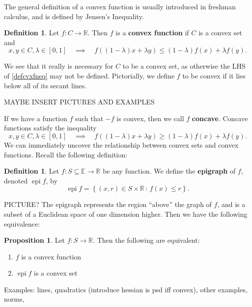\documentclass[11pt]{article}
\numberwithin{equation}{section}
\theoremstyle{definition}
\newtheorem{proposition}[theorem]{Proposition}
\newtheorem{definition}[theorem]{Definition}%
\newcommand{\bE}{\mathbb{E}}
\newcommand{\bR}{\mathbb{R}}
\newcommand{\set}[2]{\left\{#1\,:\,#2\right\}}
\newcommand{\epi}{\operatorname{epi}}
\begin{document}
The general definition of a convex function is usually introduced in freshman calculus, and is defined by Jensen's Inequality.
\begin{definition}
    Let $f:C\to\bR$. Then $f$ is a \textbf{convex function} if $C$ is a convex set and
    \begin{equation}
        \label{defcvxfneq}
        x, y\in C, \lambda\in[0, 1]\quad\implies\quad f((1-\lambda)x+\lambda y)\le (1-\lambda)f(x)+\lambda f(y).
    \end{equation}
\end{definition}
We see that it really is necessary for $C$ to be a convex set, as otherwise the LHS of \ref{defcvxfneq} may not be defined. Pictorially, we define $f$ to be convex if it lies below all of its secant lines.

MAYBE INSERT PICTURES AND EXAMPLES

If we have a function $f$ such that $-f$ is convex, then we call $f$ \textbf{concave}. Concave functions satisfy the inequality
    \begin{equation}
        \label{defccvfneq}
        x, y\in C, \lambda\in[0, 1]\quad\implies\quad f((1-\lambda)x+\lambda y)\ge (1-\lambda)f(x)+\lambda f(y).
    \end{equation}
We can immediately uncover the relationship between convex sets and convex functions. Recall the following definition:
\begin{definition}
    Let $f:S\subseteq\bE\to\bR$ be any function. We define the \textbf{epigraph} of $f$, denoted $\epi f$, by
    \begin{equation}
        \epi f=\set{(x, r)\in S\times\bR}{f(x)\le r}.
    \end{equation}
\end{definition}
PICTURE? The epigraph represents the region ``above'' the graph of $f$, and is a subset of a Euclidean space of one dimension higher. Then we have the following equivalence:
\begin{proposition}
    Let $f:S\to\bR$. Then the following are equivalent:
    \begin{enumerate}[label=(\roman*)]
        \item $f$ is a convex function
        \item $\epi f$ is a convex set
    \end{enumerate}
\end{proposition}
Examples: lines, quadratics (introduce hessian is psd iff convex), other examples, norms,
\end{document}
